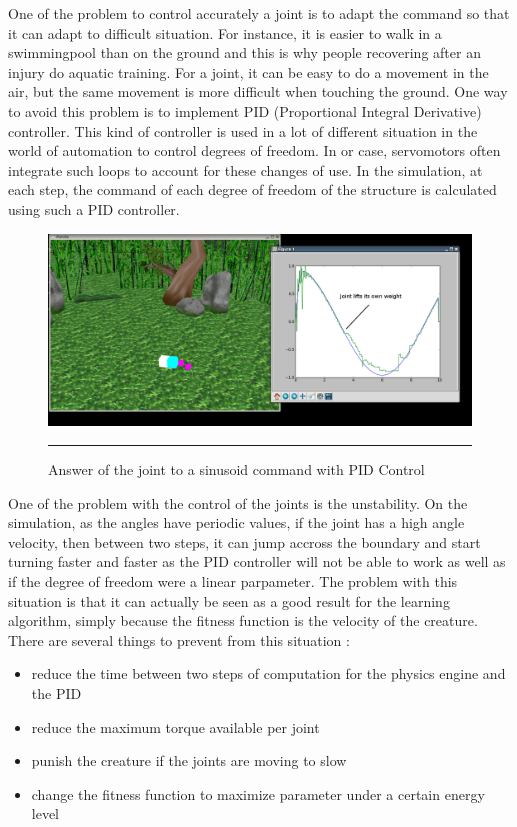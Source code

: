 One of the problem to control accurately a joint is to adapt the command so that it can adapt to difficult situation. For instance, it is easier to walk in a swimmingpool than on the ground and this is why people recovering after an injury do aquatic training. For a joint, it can be easy to do a movement in the air, but the same movement is more difficult when touching the ground. One way to avoid this problem is to implement PID (Proportional Integral Derivative) controller. This kind of controller is used in a lot of different situation in the world of automation to control degrees of freedom. In or case, servomotors often integrate such loops to account for these changes of use. In the simulation, at each step, the command of each degree of freedom of the structure is calculated using such a PID controller. 

\begin{figure}[htbp]
    \centering
    \includegraphics[scale=0.3]{Figures/servomotor.png}
    \rule{35em}{0.5pt}
    \caption[Answer of a joint to a sinusoid command]{Answer of the joint to a sinusoid command with PID Control}
    \label{fig:Snake}
\end{figure}

One of the problem with the control of the joints is the unstability. On the simulation, as the angles have periodic values, if the joint has a high angle velocity, then between two steps, it can jump accross the boundary and start turning faster and faster as the PID controller will not be able to work as well as if the degree of freedom were a linear parpameter. The problem with this situation is that it can actually be seen as a good result for the learning algorithm, simply because the fitness function is the velocity of the creature. There are several things to prevent from this situation :

\begin{itemize}
    \item reduce the time between two steps of computation for the physics engine and the PID
    \item reduce the maximum torque available per joint
    \item punish the creature if the joints are moving to slow
    \item change the fitness function to maximize parameter under a certain energy level
\end{itemize}
        

